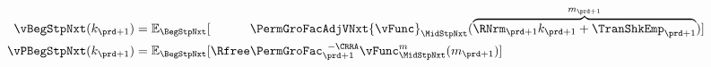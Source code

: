   \begin{equation}\begin{gathered}\begin{aligned}
        \vBegStpNxt({k}_{\prd+1})    & = \Ex_{\BegStpNxt}[\phantom{\Rfree}\PermGroFacAdjVNxt{\vFunc}_{\MidStpNxt}(\overbrace{\RNrm_{\prd+1}{k}_{\prd+1}+{\TranShkEmp}_{\prd+1}}^{{m}_{\prd+1}})] \label{eq:vFuncBegtpdefn} \\
        {\vPBegStpNxt}({k}_{\prd+1}) & = \Ex_{\BegStpNxt}[\Rfree \PermGroFac_{\prd+1}^{\phantom{1}-\CRRA} {\vFunc}_{\MidStpNxt}^{{m}}({m}_{\prd+1})]
      \end{aligned}\end{gathered}\end{equation}
